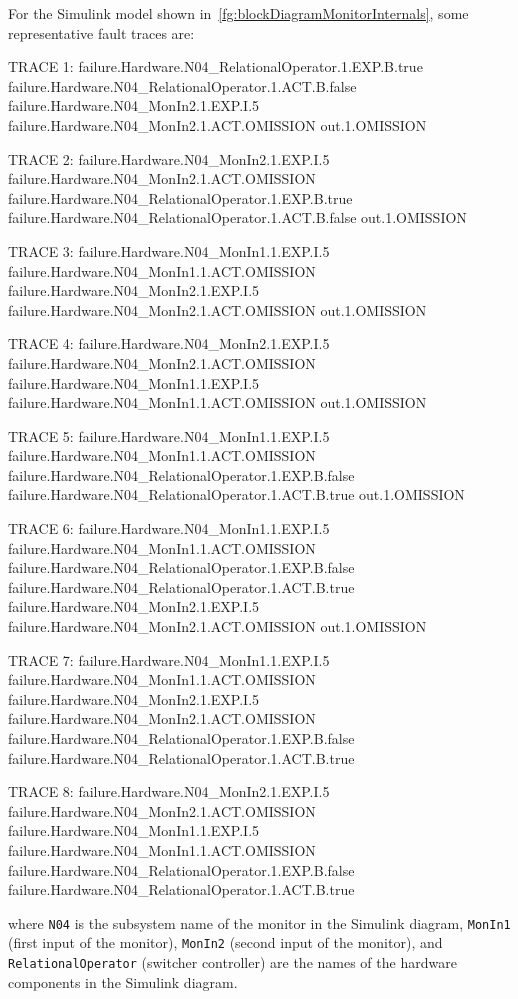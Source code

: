 \documentclass[en,twoside,onehalfspacing,phd]{risethesis}
\newenvironment{snippetcspm}[1][2]
{
\ifthenelse{\equal{#1}{0}}
    {\tiny}
    {
    \ifthenelse{\equal{#1}{1}}
        {\scriptsize}
        {
        \ifthenelse{\equal{#1}{2}}
            {\footnotesize}
            {\small}
        }
    }
\verbatim
}
{
\endverbatim
}
\newcommand{\simulink}{Simulink\xspace}
\begin{document}
For the \simulink model shown in~\cref{fg:blockDiagramMonitorInternals}, some representative fault traces are:

\begin{snippetcspm}[1]
TRACE 1:
failure.Hardware.N04_RelationalOperator.1.EXP.B.true
failure.Hardware.N04_RelationalOperator.1.ACT.B.false
failure.Hardware.N04_MonIn2.1.EXP.I.5
failure.Hardware.N04_MonIn2.1.ACT.OMISSION
out.1.OMISSION

TRACE 2:
failure.Hardware.N04_MonIn2.1.EXP.I.5
failure.Hardware.N04_MonIn2.1.ACT.OMISSION
failure.Hardware.N04_RelationalOperator.1.EXP.B.true
failure.Hardware.N04_RelationalOperator.1.ACT.B.false
out.1.OMISSION

TRACE 3:
failure.Hardware.N04_MonIn1.1.EXP.I.5
failure.Hardware.N04_MonIn1.1.ACT.OMISSION
failure.Hardware.N04_MonIn2.1.EXP.I.5
failure.Hardware.N04_MonIn2.1.ACT.OMISSION
out.1.OMISSION

TRACE 4:
failure.Hardware.N04_MonIn2.1.EXP.I.5
failure.Hardware.N04_MonIn2.1.ACT.OMISSION
failure.Hardware.N04_MonIn1.1.EXP.I.5
failure.Hardware.N04_MonIn1.1.ACT.OMISSION
out.1.OMISSION

TRACE 5:
failure.Hardware.N04_MonIn1.1.EXP.I.5
failure.Hardware.N04_MonIn1.1.ACT.OMISSION
failure.Hardware.N04_RelationalOperator.1.EXP.B.false
failure.Hardware.N04_RelationalOperator.1.ACT.B.true
out.1.OMISSION

TRACE 6:
failure.Hardware.N04_MonIn1.1.EXP.I.5
failure.Hardware.N04_MonIn1.1.ACT.OMISSION
failure.Hardware.N04_RelationalOperator.1.EXP.B.false
failure.Hardware.N04_RelationalOperator.1.ACT.B.true
failure.Hardware.N04_MonIn2.1.EXP.I.5
failure.Hardware.N04_MonIn2.1.ACT.OMISSION
out.1.OMISSION

TRACE 7:
failure.Hardware.N04_MonIn1.1.EXP.I.5
failure.Hardware.N04_MonIn1.1.ACT.OMISSION
failure.Hardware.N04_MonIn2.1.EXP.I.5
failure.Hardware.N04_MonIn2.1.ACT.OMISSION
failure.Hardware.N04_RelationalOperator.1.EXP.B.false
failure.Hardware.N04_RelationalOperator.1.ACT.B.true

TRACE 8:
failure.Hardware.N04_MonIn2.1.EXP.I.5
failure.Hardware.N04_MonIn2.1.ACT.OMISSION
failure.Hardware.N04_MonIn1.1.EXP.I.5
failure.Hardware.N04_MonIn1.1.ACT.OMISSION
failure.Hardware.N04_RelationalOperator.1.EXP.B.false
failure.Hardware.N04_RelationalOperator.1.ACT.B.true
\end{snippetcspm}
%
where \verb$N04$ is the subsystem name of the monitor in the \simulink diagram, \verb$MonIn1$ (first input of the monitor), \verb$MonIn2$ (second input of the monitor), and \verb$RelationalOperator$ (switcher controller) are the names of the hardware components in the \simulink diagram.
\end{document}
